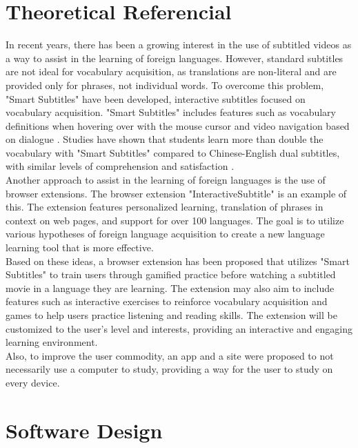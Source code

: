 \documentclass[12pt]{article}
\begin{document}
\section{Theoretical Referencial}
In recent years, there has been a growing interest in the use of subtitled videos as a way to assist in the learning of foreign languages. However, standard subtitles are not ideal for vocabulary acquisition, as translations are non-literal and are provided only for phrases, not individual words. To overcome this problem, "Smart Subtitles" have been developed, interactive subtitles focused on vocabulary acquisition. "Smart Subtitles" includes features such as vocabulary definitions when hovering over with the mouse cursor and video navigation based on dialogue \cite{Kovacs13}. Studies have shown that students learn more than double the vocabulary with "Smart Subtitles" compared to Chinese-English dual subtitles, with similar levels of comprehension and satisfaction \cite{Kovacs14}. \\ 
Another approach to assist in the learning of foreign languages is the use of browser extensions. The browser extension "InteractiveSubtitle" \cite{ElBatanony21} is an example of this. The extension features personalized learning, translation of phrases in context on web pages, and support for over 100 languages. The goal is to utilize various hypotheses of foreign language acquisition to create a new language learning tool that is more effective. \\ 
Based on these ideas, a browser extension has been proposed that utilizes "Smart Subtitles" to train users through gamified practice before watching a subtitled movie in a language they are learning. The extension may also aim to include features such as interactive exercises to reinforce vocabulary acquisition and games to help users practice listening and reading skills. The extension will be customized to the user's level and interests, providing an interactive and engaging learning environment. \\
Also, to improve the user commodity, an app and a site were proposed to not necessarily use a computer to study, providing a way for the user to study on every device. 


\section{Software Design}
\end{document}
